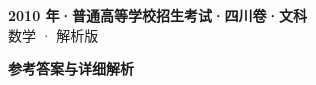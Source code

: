 \documentclass[zihao=-4, a4paper]{ctexart}
\begin{document}
\begin{center}
  {\Large\bfseries 2010 年·普通高等学校招生考试·四川卷·文科}\\[4pt]
  {\large 数学 · 解析版}
\end{center}
\medskip
{}

\clearpage
{}
\begin{center}{\Large\bfseries 参考答案与详细解析}\end{center}
\medskip

\end{document}
